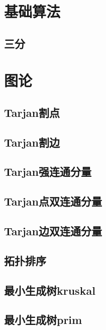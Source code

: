 \documentclass{article}
\begin{document}
\begin{multicols*}{2}

\thispagestyle{empty}
\tableofcontents
\newpage
\setcounter{page}{1}
\section{基础算法}
\subsection{三分}

\section{图论}
\subsection{Tarjan割点}

\subsection{Tarjan割边}

\subsection{Tarjan强连通分量}

\subsection{Tarjan点双连通分量}

\subsection{Tarjan边双连通分量}

\subsection{拓扑排序}

\subsection{最小生成树kruskal}

\subsection{最小生成树prim}


\end{multicols*}
\end{document}
